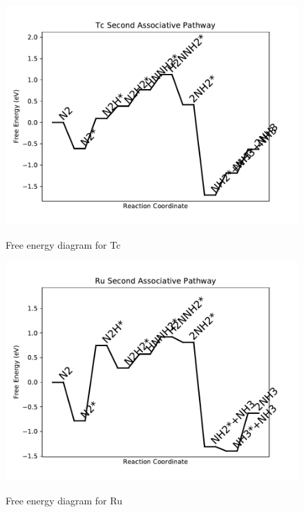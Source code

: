 \documentclass{article}
\begin{document}
\begin{figure}
\includegraphics[width=1\linewidth]{data/plots/Tc_associative_2.pdf}
\label{fig:Tc_associative_2}
\caption{Free energy diagram for Tc}
\end{figure}

\clearpage
\begin{figure}
\includegraphics[width=1\linewidth]{data/plots/Ru_associative_2.pdf}
\label{fig:Ru_associative_2}
\caption{Free energy diagram for Ru}
\end{figure}
\end{document}
